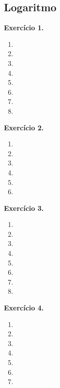 \documentclass[12pt,a4paper]{article}
\begin{document}
\subsection{Logaritmo}
\vspace{0.5cm}
\noindent\textbf{Exercício 1.}
\begin{enumerate}
    \renewcommand{\theenumi}{\alph{enumi}}
    \renewcommand{\labelenumi}{\theenumi)}
    \item 
    \item 
    \item 
    \item 
    \item 
    \item 
    \item 
    \item 
\end{enumerate}

\vspace{0.5cm}
\noindent\textbf{Exercício 2.}
\begin{enumerate}
    \renewcommand{\theenumi}{\alph{enumi}}
    \renewcommand{\labelenumi}{\theenumi)}
    \item 
    \item 
    \item 
    \item 
    \item 
    \item 
\end{enumerate}

\vspace{0.5cm}
\noindent\textbf{Exercício 3.}
\begin{enumerate}
    \renewcommand{\theenumi}{\alph{enumi}}
    \renewcommand{\labelenumi}{\theenumi)}
    \item 
    \item 
    \item 
    \item 
    \item 
    \item 
    \item 
    \item 
\end{enumerate}

\vspace{0.5cm}
\noindent\textbf{Exercício 4.}
\begin{enumerate}
    \renewcommand{\theenumi}{\alph{enumi}}
    \renewcommand{\labelenumi}{\theenumi)}
    \item 
    \item 
    \item 
    \item 
    \item 
    \item 
    \item 
\end{enumerate}
\end{document}
